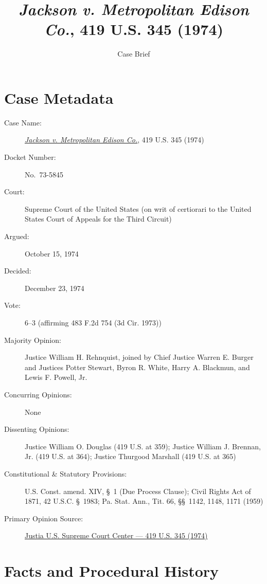 \documentclass[12pt]{article}
\title{\textit{Jackson v. Metropolitan Edison Co.}, 419 U.S. 345 (1974)}
\author{Case Brief}
\date{}
\begin{document}
\maketitle


\section{Case Metadata}

\begin{description}
  \item[Case Name:] \href{https://supreme.justia.com/cases/federal/us/419/345/}{\emph{Jackson v. Metropolitan Edison Co.}}, 419 U.S. 345 (1974)
  \item[Docket Number:] No.~73-5845
  \item[Court:] Supreme Court of the United States (on writ of certiorari to the United States Court of Appeals for the Third Circuit)
  \item[Argued:] October 15, 1974
  \item[Decided:] December 23, 1974
  \item[Vote:] 6--3 (affirming 483 F.2d 754 (3d Cir. 1973))
  \item[Majority Opinion:] Justice William H. Rehnquist, joined by Chief Justice Warren E. Burger and Justices Potter Stewart, Byron R. White, Harry A. Blackmun, and Lewis F. Powell, Jr.
  \item[Concurring Opinions:] None
  \item[Dissenting Opinions:] Justice William O. Douglas (419 U.S. at 359); Justice William J. Brennan, Jr. (419 U.S. at 364); Justice Thurgood Marshall (419 U.S. at 365)
  \item[Constitutional \& Statutory Provisions:] U.S. Const. amend. XIV, \S~1 (Due Process Clause); Civil Rights Act of 1871, 42 U.S.C. \S~1983; Pa. Stat. Ann., Tit. 66, \S\S~1142, 1148, 1171 (1959)
  \item[Primary Opinion Source:] \href{https://supreme.justia.com/cases/federal/us/419/345/}{Justia U.S. Supreme Court Center --- 419 U.S. 345 (1974)}
\end{description}

\section{Facts and Procedural History}
\end{document}
